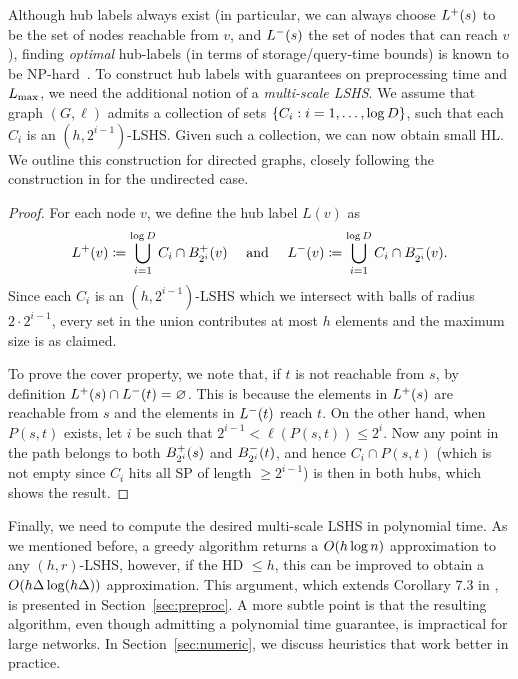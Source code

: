 Although hub labels always exist (in particular, we can always choose $\Lf(s)$ to be the set of nodes reachable from $v$, and $\Lb(s)$ the set of nodes that can reach $v$), finding \emph{optimal} hub-labels (in terms of storage/query-time bounds) is known to be NP-hard~\cite{babenko_hl_complexity}.
To construct hub labels with guarantees on preprocessing time and $\Lm$, we need the additional notion of a \emph{multi-scale LSHS}. 
We assume that graph $(G,\ell)$ admits a collection of sets $\crl*{C_i: i=1,\ldots,\log D}$, such that each $C_i$ is an $(h,2^{i-1})$-LSHS.
Given such a collection, we can now obtain small HL.
We outline this construction for directed graphs, closely following the construction in \cite[Theorem 5.1]{highway2013} for the undirected case.
\begin{proof}
For each node $v$, we define the hub label $L(v)$ as
\[
\Lf(v)\defeq  \bigcup_{i=1}^{\log D}C_i\cap \Bf_{2^i}(v) \quad\text{ and }\quad
\Lb(v)\defeq \bigcup_{i=1}^{\log D}C_i\cap \Bb_{2^i}(v).
\]
Since each $C_i$ is an $(h,2^{i-1})$-LSHS which we intersect with balls of radius $2\cdot 2^{i-1}$, every set in the union contributes at most $h$ elements and the maximum size is as claimed.

To prove the cover property, we note that, if $t$ is not reachable from $s$, by definition $\Lf(s)\cap\Lb(t)=\varnothing$.
This is because the elements in $\Lf(s)$ are reachable from $s$ and the elements in $\Lb(t)$ reach $t$.
On the other hand, when $P(s,t)$ exists, let $i$ be such that $2^{i-1}<\ell(P(s,t))\leq 2^i$.
Now any point in the path belongs to both $\Bf_{2^i}(s)$ and $\Bb_{2^i}(t)$, and hence $C_i\cap P(s,t)$  (which is not empty since $C_i$ hits all SP of length $\geq 2^{i-1}$) is then in both hubs, which shows the result.
\end{proof}


Finally, we need to compute the desired multi-scale LSHS in polynomial time.
As we mentioned before, a greedy algorithm returns a $\Or(h\log n)$ approximation to any $(h,r)$-LSHS, however, if the HD $\leq h$, this can be improved to obtain a $\Or(h\Delta\log(h\Delta))$ approximation.
This argument, which extends Corollary 7.3 in \cite{highway2013}, is presented in Section~\ref{sec:preproc}.
A more subtle point is that the resulting algorithm, even though admitting a polynomial time guarantee, is impractical for large networks.
In Section~\ref{sec:numeric}, we discuss heuristics that work better in practice.